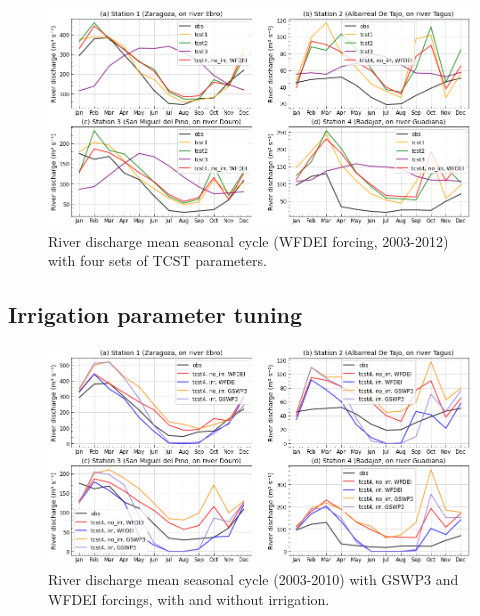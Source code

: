 \begin{figure}[htbp]
    \centering
    \includegraphics[width=\textwidth]{images/chap3/river_discharge/merit_tcst_4stations_SC.png}
    \caption{River discharge mean seasonal cycle (WFDEI forcing, 2003-2012) with four sets of TCST parameters.}
    \label{fig:merit_tcsts_stations_SC}
\end{figure}

\clearpage

\subsection{Irrigation parameter tuning}
\label{sec:forcing_irr_reduced}

\begin{figure}[htbp]
    \centering
    \includegraphics[width=\textwidth]{images/chap3/river_discharge/merit_forcing_4stations_SC.png}
    \caption{River discharge mean seasonal cycle (2003-2010) with GSWP3 and WFDEI forcings, with and without irrigation.}
    \label{fig:merit_forcing_stations_SC}
\end{figure}


